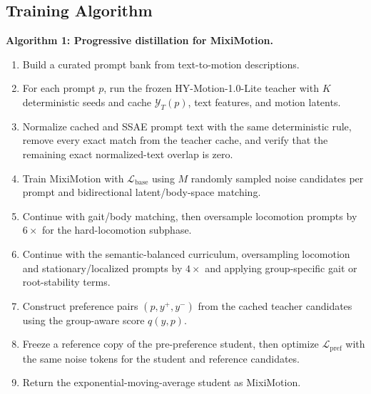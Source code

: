 \documentclass[runningheads]{llncs}
\begin{document}
\subsection{Training Algorithm}

\noindent\textbf{Algorithm 1: Progressive distillation for MixiMotion.}
\begin{enumerate}
\item Build a curated prompt bank from text-to-motion descriptions.
\item For each prompt $p$, run the frozen HY-Motion-1.0-Lite teacher with $K$
deterministic seeds and cache $\mathcal{Y}_T(p)$, text features, and motion
latents.
\item Normalize cached and SSAE prompt text with the same deterministic rule,
remove every exact match from the teacher cache, and verify that the remaining
exact normalized-text overlap is zero.
\item Train MixiMotion with $\mathcal{L}_{\mathrm{base}}$ using $M$ randomly
sampled noise candidates per prompt and bidirectional latent/body-space
matching.
\item Continue with gait/body matching, then oversample locomotion prompts by
$6\times$ for the hard-locomotion subphase.
\item Continue with the semantic-balanced curriculum, oversampling locomotion
and stationary/localized prompts by $4\times$ and applying group-specific gait
or root-stability terms.
\item Construct preference pairs $(p,y^+,y^-)$ from the cached teacher
candidates using the group-aware score $q(y,p)$.
\item Freeze a reference copy of the pre-preference student, then optimize
$\mathcal{L}_{\mathrm{pref}}$ with the same noise tokens for the student and
reference candidates.
\item Return the exponential-moving-average student as MixiMotion.
\end{enumerate}
\end{document}
